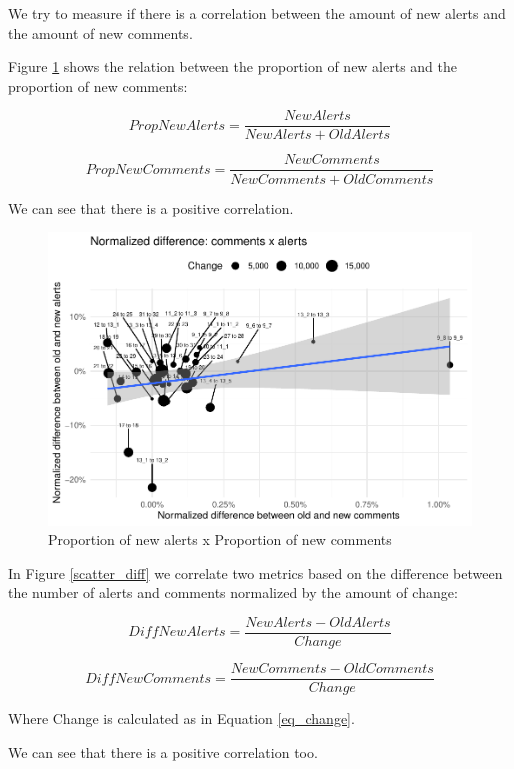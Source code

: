 \documentclass[
]{article}
\begin{document}
\normalsize

\newpage

We try to measure if there is a correlation between the amount of new
alerts and the amount of new comments.

Figure \ref{scatter_prop} shows the relation between the proportion of
new alerts and the proportion of new comments:

\[PropNewAlerts = \frac{NewAlerts}{NewAlerts + OldAlerts}\]

\[PropNewComments = \frac{NewComments}{NewComments + OldComments}\]

We can see that there is a positive correlation.

\small

\begin{figure}
\centering
\includegraphics{report_files/figure-latex/unnamed-chunk-22-1.pdf}
\caption{\label{scatter_prop}Proportion of new alerts x Proportion of
new comments}
\end{figure}

\normalsize

In Figure \ref{scatter_diff} we correlate two metrics based on the
difference between the number of alerts and comments normalized by the
amount of change:

\[DiffNewAlerts = \frac{NewAlerts - OldAlerts}{Change}\]

\[DiffNewComments = \frac{NewComments - OldComments}{Change}\]

Where Change is calculated as in Equation \ref{eq_change}.

We can see that there is a positive correlation too.

\small
\end{document}
